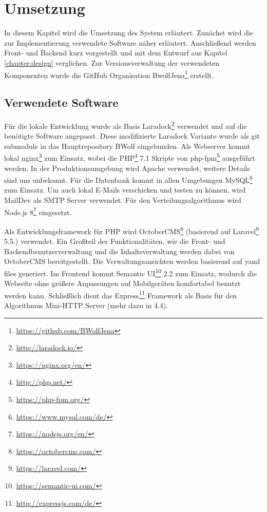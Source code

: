 \chapter{Umsetzung}
\label{chapter:implementation}
    In diesem Kapitel wird die Umsetzung des System erläutert.
    Zunächst wird die zur Implementierung verwendete Software näher erläutert.
    Anschließend werden Front- und Backend kurz vorgestellt und mit dem Entwurf aus Kapitel \ref{chapter:design} verglichen.
    Zur Versionsverwaltung der verwendeten Komponenten wurde die GitHub Organisation BwolfJena\footnote{\href{https://github.com/BWolfJena}{https://github.com/BWolfJena}} erstellt.
    
    \section{Verwendete Software}

        Für die lokale Entwicklung wurde als Basis Laradock\footnote{\href{http://laradock.io/}{http://laradock.io/}} verwendet und auf die benötigte Software angepasst.
        Diese modifizierte Laradock Variante wurde als git submodule in das Hauptrepository BWolf eingebunden.
        Als Webserver kommt lokal nginx\footnote{\href{https://nginx.org/en/}{https://nginx.org/en/}} zum Einsatz, wobei die PHP\footnote{\href{http://php.net/}{http://php.net/}} 7.1 Skripte von php-fpm\footnote{\href{https://php-fpm.org/}{https://php-fpm.org/}} ausgeführt werden.
        In der Produktionsumgebung wird Apache verwendet, weitere Details sind uns unbekannt. 
        Für die Datenbank kommt in allen Umgebungen MySQL\footnote{\href{https://www.mysql.com/de/}{https://www.mysql.com/de/}} zum Einsatz.
        Um auch lokal E-Mails verschicken und testen zu können, wird MailDev als SMTP Server verwendet.
        Für den Verteilungsalgorithmus wird Node.js 8\footnote{\href{https://nodejs.org/en/}{https://nodejs.org/en/}} eingesetzt.
        
        Als Entwicklungsframework für PHP wird OctoberCMS\footnote{\href{https://octobercms.com/}{https://octobercms.com/}} (basierend auf Laravel\footnote{\href{https://laravel.com/}{https://laravel.com/}} 5.5.) verwendet. Ein Großteil der Funktionalitäten, wie die Front- und Backendbenutzerverwaltung und die Inhaltsverwaltung werden dabei von OctoberCMS bereitgestellt. Die Verwaltungsansichten werden basierend auf yaml files generiert. Im Frontend kommt Semantic UI\footnote{\href{https://semantic-ui.com/}{https://semantic-ui.com/}} 2.2 zum Einsatz, wodurch die Webseite ohne größere Anpassungen auf Mobilgeräten komfortabel benutzt werden kann. Schließlich 
        dient das Express\footnote{\href{http://expressjs.com/de/}{http://expressjs.com/de/}} Framework als Basis für den Algorithmus Mini-HTTP Server (mehr dazu in 4.4).                
